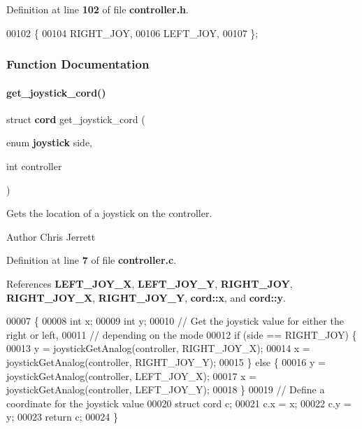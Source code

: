 Definition at line \textbf{ 102} of file \textbf{ controller.\+h}.


\begin{DoxyCode}
00102               \{
00104   RIGHT_JOY,
00106   LEFT_JOY,
00107 \};
\end{DoxyCode}


\subsubsection{Function Documentation}
\mbox{\label{a00011_a0ce0176099c0bb15ad8c36123222059d}} 
\paragraph{get\+\_\+joystick\+\_\+cord()}
{\footnotesize\ttfamily struct \textbf{ cord} get\+\_\+joystick\+\_\+cord (\begin{DoxyParamCaption}\item[{enum \textbf{ joystick}}]{side,  }\item[{int}]{controller }\end{DoxyParamCaption})}



Gets the location of a joystick on the controller. 

\begin{DoxyAuthor}{Author}
Chris Jerrett 
\end{DoxyAuthor}


Definition at line \textbf{ 7} of file \textbf{ controller.\+c}.



References \textbf{ L\+E\+F\+T\+\_\+\+J\+O\+Y\+\_\+X}, \textbf{ L\+E\+F\+T\+\_\+\+J\+O\+Y\+\_\+Y}, \textbf{ R\+I\+G\+H\+T\+\_\+\+J\+OY}, \textbf{ R\+I\+G\+H\+T\+\_\+\+J\+O\+Y\+\_\+X}, \textbf{ R\+I\+G\+H\+T\+\_\+\+J\+O\+Y\+\_\+Y}, \textbf{ cord\+::x}, and \textbf{ cord\+::y}.


\begin{DoxyCode}
00007                                                                   \{
00008   \textcolor{keywordtype}{int} x;
00009   \textcolor{keywordtype}{int} y;
00010   \textcolor{comment}{// Get the joystick value for either the right or left,}
00011   \textcolor{comment}{// depending on the mode}
00012   \textcolor{keywordflow}{if} (side == RIGHT_JOY) \{
00013     y = joystickGetAnalog(controller, RIGHT_JOY_X);
00014     x = joystickGetAnalog(controller, RIGHT_JOY_Y);
00015   \} \textcolor{keywordflow}{else} \{
00016     y = joystickGetAnalog(controller, LEFT_JOY_X);
00017     x = joystickGetAnalog(controller, LEFT_JOY_Y);
00018   \}
00019   \textcolor{comment}{// Define a coordinate for the joystick value}
00020   \textcolor{keyword}{struct }cord c;
00021   c.x = x;
00022   c.y = y;
00023   \textcolor{keywordflow}{return} c;
00024 \}
\end{DoxyCode}
